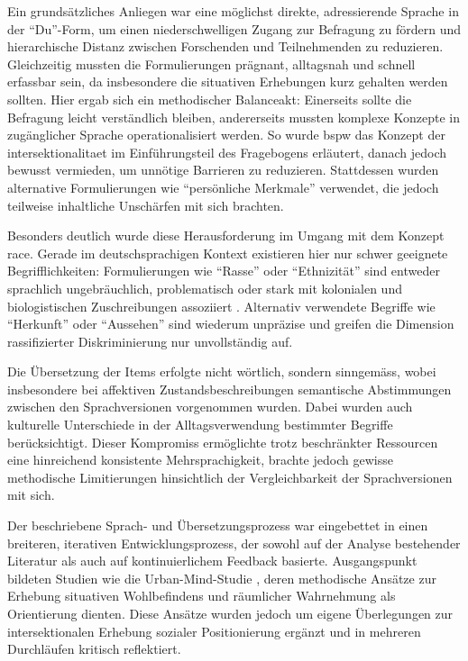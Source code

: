 Ein grundsätzliches Anliegen war eine möglichst direkte, adressierende Sprache in der \enquote{Du}-Form, um einen niederschwelligen Zugang zur Befragung zu fördern und hierarchische Distanz zwischen Forschenden und Teilnehmenden zu reduzieren. Gleichzeitig mussten die Formulierungen prägnant, alltagsnah und schnell erfassbar sein, da insbesondere die situativen Erhebungen kurz gehalten werden sollten. Hier ergab sich ein methodischer Balanceakt: Einerseits sollte die Befragung leicht verständlich bleiben, andererseits mussten komplexe Konzepte in zugänglicher Sprache operationalisiert werden. So wurde \gls{bspw} das Konzept der \gls{intersektionalitaet} im Einführungsteil des Fragebogens erläutert, danach jedoch bewusst vermieden, um unnötige Barrieren zu reduzieren. Stattdessen wurden alternative Formulierungen wie \enquote{persönliche Merkmale} verwendet, die jedoch teilweise inhaltliche Unschärfen mit sich brachten. 

Besonders deutlich wurde diese Herausforderung im Umgang mit dem Konzept \gls{race}. Gerade im deutschsprachigen Kontext existieren hier nur schwer geeignete Begrifflichkeiten: Formulierungen wie \enquote{Rasse} oder \enquote{Ethnizität} sind entweder sprachlich ungebräuchlich, problematisch oder stark mit kolonialen und biologistischen Zuschreibungen assoziiert \parencite[\acrshort{vgl}][]{roigIntersectionalityEuropeDepoliticized2018}. Alternativ verwendete Begriffe wie \enquote{Herkunft} oder \enquote{Aussehen} sind wiederum unpräzise und greifen die Dimension rassifizierter Diskriminierung nur unvollständig auf.

Die Übersetzung der Items erfolgte nicht wörtlich, sondern sinngemäss, wobei insbesondere bei affektiven Zustandsbeschreibungen semantische Abstimmungen zwischen den Sprachversionen vorgenommen wurden. Dabei wurden auch kulturelle Unterschiede in der Alltagsverwendung bestimmter Begriffe berücksichtigt. Dieser Kompromiss ermöglichte trotz beschränkter Ressourcen eine hinreichend konsistente Mehrsprachigkeit, brachte jedoch gewisse methodische Limitierungen hinsichtlich der Vergleichbarkeit der Sprachversionen mit sich.

Der beschriebene Sprach- und Übersetzungsprozess war eingebettet in einen breiteren, iterativen Entwicklungsprozess, der sowohl auf der Analyse bestehender Literatur als auch auf kontinuierlichem Feedback basierte. Ausgangspunkt bildeten Studien wie die Urban-Mind-Studie \parencite{bakolisUrbanMindUsing2018}, deren methodische Ansätze zur Erhebung situativen Wohlbefindens und räumlicher Wahrnehmung als Orientierung dienten. Diese Ansätze wurden jedoch um eigene Überlegungen zur intersektionalen Erhebung sozialer Positionierung ergänzt und in mehreren Durchläufen kritisch reflektiert.

